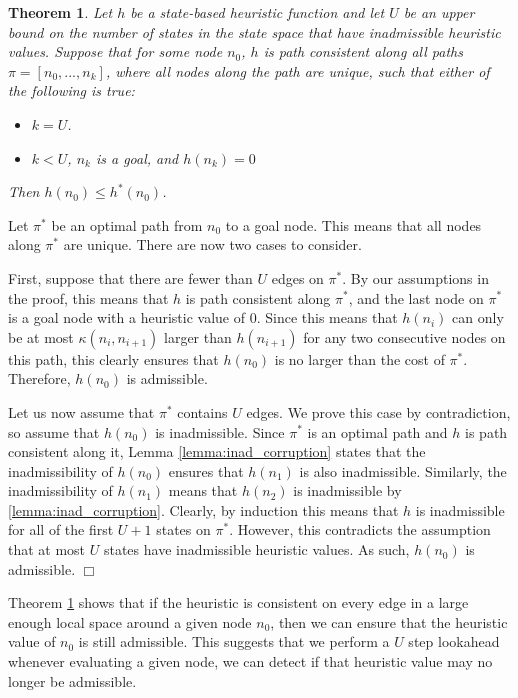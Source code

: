 \documentclass[letterpaper]{article}
\newtheorem{theorem}{Theorem}
\newenvironment{proof}{\par\noindent{\em Proof.}}{\hfill $\Box$\medskip}
\begin{document}
\begin{theorem}%
Let $h$ be a state-based heuristic function and let $U$ be an upper bound on the number of states in the state space that have inadmissible heuristic values. Suppose that for some node $n_0$, $h$ is path consistent along all paths $\pi=[n_0, ..., n_k]$, where all nodes along the path are unique, such that either of the following is true:
\begin{itemize}
\item $k = U$.
\item $k < U$, $n_k$ is a goal, and $h(n_k) = 0$
\end{itemize}
Then $h(n_0) \leq h^*(n_0)$.
\label{the:inadmissible-detection}
\end{theorem}
\begin{proof}
Let $\pi^*$ be an optimal path from $n_0$ to a goal node. This means that all nodes along $\pi^*$ are unique. There are now two cases to consider.

First, suppose that there are fewer than $U$ edges on $\pi^*$. By our assumptions in the proof, this means that $h$ is path consistent along $\pi^*$, and the last node on $\pi^*$ is a goal node with a heuristic value of $0$. Since this means that $h(n_i)$ can only be at most $\kappa(n_i, n_{i+1})$ larger than $h(n_{i+1})$ for any two consecutive nodes on this path, this clearly ensures that $h(n_0)$ is no larger than the cost of $\pi^*$. Therefore, $h(n_0)$ is admissible.

Let us now assume that $\pi^*$ contains $U$ edges. We prove this case by contradiction, so assume that $h(n_0)$ is inadmissible. Since $\pi^*$ is an optimal path and $h$ is path consistent along it, Lemma \ref{lemma:inad_corruption} states that the inadmissibility of $h(n_0)$ ensures that $h(n_1)$ is also inadmissible. Similarly, the inadmissibility of $h(n_1)$ means that $h(n_2)$ is inadmissible by \ref{lemma:inad_corruption}. Clearly, by induction this means that $h$ is inadmissible for all of the first $U+1$ states on $\pi^*$. However, this contradicts the assumption that at most $U$ states have inadmissible heuristic values. As such, $h(n_0)$ is admissible.
\end{proof}

Theorem \ref{the:inadmissible-detection} shows that if the heuristic is consistent on every edge in a large enough local space around a given node $n_0$, then we can ensure that the heuristic value of $n_0$ is still admissible. This suggests that we perform a $U$ step lookahead whenever evaluating a given node, we can detect if that heuristic value may no longer be admissible.
\end{document}
